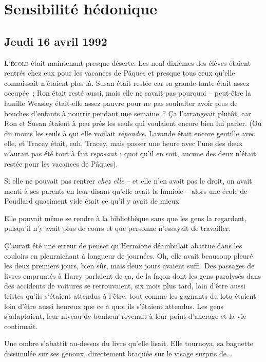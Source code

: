 \chapter{Sensibilité hédonique}

\section{Jeudi 16 avril 1992}

\lettrine{L}{'école}  était maintenant presque déserte.
Les neuf dixièmes des élèves étaient rentrés chez eux pour les vacances de Pâques et presque tous ceux qu'elle connaissait n'étaient plus là.
Susan était restée car sa grande-tante était assez occupée~; Ron était resté aussi, mais elle ne savait pas pourquoi -- peut-être la famille Weasley était-elle assez pauvre pour ne pas souhaiter avoir plus de bouches d'enfants à nourrir pendant une semaine~?
Ça l'arrangeait plutôt, car Ron et Susan étaient à peu près les seuls qui voulaient encore bien lui parler.
(Ou du moins les seuls à qui elle voulait \emph{répondre}.
Lavande était encore gentille avec elle, et Tracey était, euh, Tracey, mais passer une heure avec l'une des deux n'aurait pas été tout à fait \emph{reposant}~; quoi qu'il en soit, aucune des deux n'était restée pour les vacances de Pâques).

Si elle ne pouvait pas rentrer \emph{chez elle} -- et elle n'en avait pas le droit, on avait menti à ses parents en leur disant qu'elle avait la lumiole -- alors une école de Poudlard quasiment vide était ce qu'il y avait de mieux.

Elle pouvait même se rendre à la bibliothèque sans que les gens la regardent, puisqu'il n'y avait plus de cours et que personne n'essayait de travailler.

Ç'aurait été une erreur de penser qu'Hermione déambulait abattue dans les couloirs en pleurnichant à longueur de journées.
Oh, elle avait beaucoup pleuré les deux premiers jours, bien sûr, mais deux jours avaient suffi.
Des passages de livres empruntés à Harry parlaient de ça, de la façon dont les gens paralysés dans des accidents de voitures se retrouvaient, six mois plus tard, loin d'être aussi tristes qu'ils s'étaient attendus à l'être, tout comme les gagnants du loto étaient loin d'être aussi heureux que ce à quoi ils s'étaient attendus.
Les gens s'adaptaient, leur niveau de bonheur revenait à leur point d'ancrage et la vie continuait.

Une ombre s'abattit au-dessus du livre qu'elle lisait.
Elle tournoya, sa baguette dissimulée sur ses genoux, directement braquée sur le visage surpris de…

